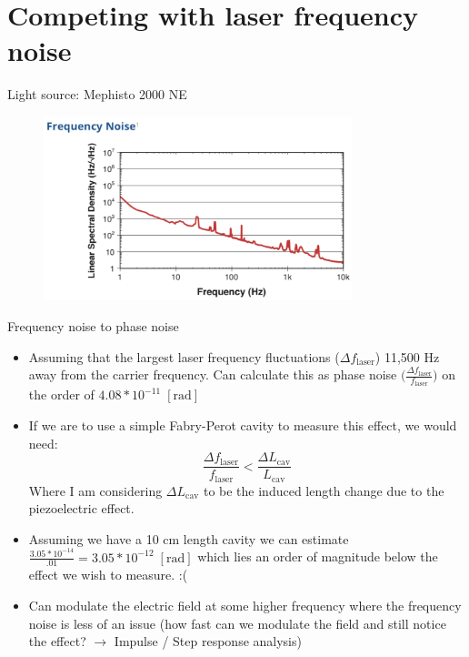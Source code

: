 \documentclass{beamer}
\begin{document}
\section{Competing with laser frequency noise}
\begin{frame}{Light source: Mephisto 2000 NE}
 \begin{figure}[H]
  \centering
  \includegraphics[width=90mm]{freq_noise_mephisto_2000NE.png}
 \end{figure}
\end{frame}

\begin{frame}{Frequency noise to phase noise}
\begin{itemize}
  \item Assuming that the largest laser frequency fluctuations ($\Delta f_\mathrm{laser}$) 11,500 Hz away from the carrier frequency. Can calculate this as phase noise $\big(\frac{\Delta f_{\mathrm{laser}}}{f_{\mathrm{laser}}}\big)$ on the order of $4.08*10^{-11}\; [\mathrm{rad}]$
  \item If we are to use a simple Fabry-Perot cavity to measure this effect, we would need:
$$\frac{\Delta f_{\mathrm{laser}}}{f_{\mathrm{laser}}}< \frac{\Delta L_{\mathrm{cav}}}{L_{\mathrm{cav}}}$$
Where I am considering $\Delta L_{\mathrm{cav}}$ to be the induced length change due to the piezoelectric effect.
  \item Assuming we have a 10 cm length cavity we can estimate $\frac{3.05*10^{-14}}{.01} = 3.05*10^{-12}\; [\mathrm{rad}]$ which lies an order of magnitude below the effect we wish to measure. :(
  \item Can modulate the electric field at some higher frequency where the frequency noise is less of an issue (how fast can we modulate the field and still notice the effect? $\rightarrow$ Impulse / Step response analysis)
\end{itemize}
\end{frame}
\end{document}
